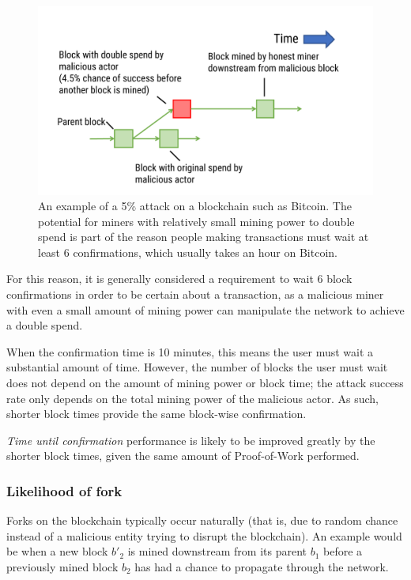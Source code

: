 \documentclass[a4paper,12pt]{article}
\begin{document}
\begin{figure}[!htb]
  \centering
  \includegraphics[page=1,width=.95\textwidth]{5-percent-attack} 
  \caption{An example of a 5\% attack on a blockchain such as Bitcoin. The potential for miners with relatively small mining power to double spend is part of the reason people making transactions must wait at least 6 confirmations, which usually takes an hour on Bitcoin.}
  \label{fig:5-percent-attack}
\end{figure}
\FloatBarrier

For this reason, it is generally considered a requirement to wait 6 block confirmations in order to be certain about a transaction, as a malicious miner with even a small amount of mining power can manipulate the network to achieve a double spend.

When the confirmation time is 10 minutes, this means the user must wait a substantial amount of time. However, the number of blocks the user must wait does not depend on the amount of mining power or block time; the attack success rate only depends on the total mining power of the malicious actor. As such, shorter block times provide the same block-wise confirmation.

\textit{Time until confirmation} performance is likely to be improved greatly by the shorter block times, given the same amount of Proof-of-Work performed.

\subsubsection{Likelihood of fork}
Forks on the blockchain typically occur naturally (that is, due to random chance instead of a malicious entity trying to disrupt the blockchain). An example would be when a new block $b'_2$ is mined downstream from its parent $b_1$ before a previously mined block $b_2$ has had a chance to propagate through the network. 
\end{document}
